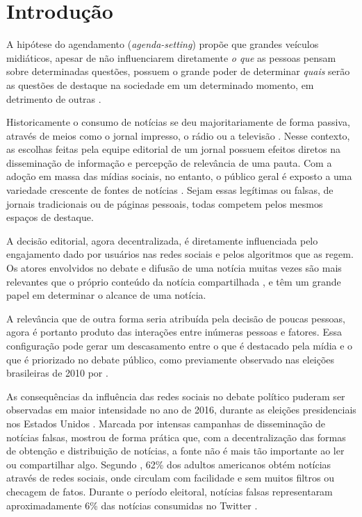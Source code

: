 \documentclass[
	12pt,
	oneside,
	a4paper,
	english,
	brazil
]{abntex2ppgsi}
\begin{document}
\textual

\chapter{Introdução}
A hipótese do agendamento (\textit{agenda-setting}) propõe que grandes veículos midiáticos, apesar de não influenciarem diretamente \textit{o que} as pessoas pensam sobre determinadas questões, possuem o grande poder de determinar \textit{quais} serão as questões de destaque na sociedade em um determinado momento, em detrimento de outras \cite{mccombs}.

Historicamente o consumo de notícias se deu majoritariamente de forma passiva, através de meios como o jornal impresso, o rádio ou a televisão \cite{ahlers}. Nesse contexto, as escolhas feitas pela equipe editorial de um jornal possuem efeitos diretos na disseminação de informação e percepção de relevância de uma pauta. Com a adoção em massa das mídias sociais, no entanto, o público geral é exposto a uma variedade crescente de fontes de notícias \cite{sterrett}. Sejam essas legítimas ou falsas, de jornais tradicionais ou de páginas pessoais, todas competem pelos mesmos espaços de destaque.

A decisão editorial, agora decentralizada, é diretamente influenciada pelo engajamento dado por usuários nas redes sociais e pelos algoritmos que as regem. Os atores envolvidos no debate e difusão de uma notícia muitas vezes são mais relevantes que o próprio conteúdo da notícia compartilhada \cite{chen}, e têm um grande papel em determinar o alcance de uma notícia.

A relevância que de outra forma seria atribuída pela decisão de poucas pessoas, agora é portanto produto das interações entre inúmeras pessoas e fatores. Essa configuração pode gerar um descasamento entre o que é destacado pela mídia e o que é priorizado no debate público, como previamente observado nas eleições brasileiras de 2010 por .

As consequências da influência das redes sociais no debate político puderam ser observadas em maior intensidade no ano de 2016, durante as eleições presidenciais nos Estados Unidos \cite{allcott}. Marcada por intensas campanhas de disseminação de notícias falsas, mostrou de forma prática que, com a decentralização das formas de obtenção e distribuição de notícias, a fonte não é mais tão importante ao ler ou compartilhar algo. Segundo , 62\% dos adultos americanos obtém notícias através de redes sociais, onde circulam com facilidade e sem muitos filtros ou checagem de fatos. Durante o período eleitoral, notícias falsas representaram aproximadamente 6\% das notícias consumidas no Twitter \cite{grindberg}.
\end{document}
